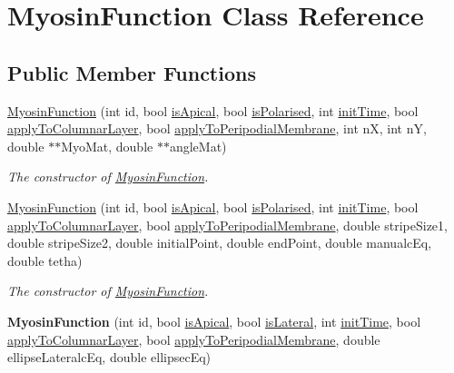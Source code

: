 \hypertarget{classMyosinFunction}{}\section{Myosin\+Function Class Reference}
\label{classMyosinFunction}
\subsection*{Public Member Functions}
\begin{DoxyCompactItemize}
\item 
\hyperlink{classMyosinFunction_a25c83e1aaafc9d029e6c551008114ef7}{Myosin\+Function} (int id, bool \hyperlink{classMyosinFunction_a413c9a88624a97f6483efebdc5ab6fac}{is\+Apical}, bool \hyperlink{classMyosinFunction_a66bf31a5b46a19e67691d67b25c03852}{is\+Polarised}, int \hyperlink{classMyosinFunction_a5bf0e10f1e37ef01762fe72305d2e4d2}{init\+Time}, bool \hyperlink{classMyosinFunction_a6a978e5577af3f6b56edda5fd825d89c}{apply\+To\+Columnar\+Layer}, bool \hyperlink{classMyosinFunction_a76b32da8850a97ca48046d34542ee1c0}{apply\+To\+Peripodial\+Membrane}, int n\+X, int n\+Y, double $\ast$$\ast$Myo\+Mat, double $\ast$$\ast$angle\+Mat)
\begin{DoxyCompactList}\small\item\em The constructor of \hyperlink{classMyosinFunction}{Myosin\+Function}. \end{DoxyCompactList}\item 
\hyperlink{classMyosinFunction_a9a1d0f2da5bf8c9f3e9f48d88297c3fd}{Myosin\+Function} (int id, bool \hyperlink{classMyosinFunction_a413c9a88624a97f6483efebdc5ab6fac}{is\+Apical}, bool \hyperlink{classMyosinFunction_a66bf31a5b46a19e67691d67b25c03852}{is\+Polarised}, int \hyperlink{classMyosinFunction_a5bf0e10f1e37ef01762fe72305d2e4d2}{init\+Time}, bool \hyperlink{classMyosinFunction_a6a978e5577af3f6b56edda5fd825d89c}{apply\+To\+Columnar\+Layer}, bool \hyperlink{classMyosinFunction_a76b32da8850a97ca48046d34542ee1c0}{apply\+To\+Peripodial\+Membrane}, double stripe\+Size1, double stripe\+Size2, double initial\+Point, double end\+Point, double manualc\+Eq, double tetha)
\begin{DoxyCompactList}\small\item\em The constructor of \hyperlink{classMyosinFunction}{Myosin\+Function}. \end{DoxyCompactList}\item 
\hypertarget{classMyosinFunction_a45f513ee1fca07a4095ec83566da093f}{}{\bfseries Myosin\+Function} (int id, bool \hyperlink{classMyosinFunction_a413c9a88624a97f6483efebdc5ab6fac}{is\+Apical}, bool \hyperlink{classMyosinFunction_ae4176116404c97b86f7e76ee359f8499}{is\+Lateral}, int \hyperlink{classMyosinFunction_a5bf0e10f1e37ef01762fe72305d2e4d2}{init\+Time}, bool \hyperlink{classMyosinFunction_a6a978e5577af3f6b56edda5fd825d89c}{apply\+To\+Columnar\+Layer}, bool \hyperlink{classMyosinFunction_a76b32da8850a97ca48046d34542ee1c0}{apply\+To\+Peripodial\+Membrane}, double ellipse\+Lateralc\+Eq, double ellipsec\+Eq)\label{classMyosinFunction_a45f513ee1fca07a4095ec83566da093f}


\end{DoxyCompactItemize}
